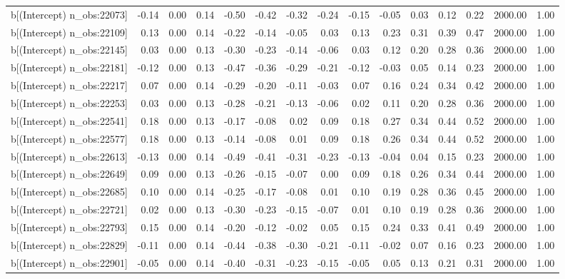 \begin{table}[ht]
\begin{tabular}{rrrrrrrrrrrrrrr}
  b[(Intercept) n\_obs:22073] & -0.14 & 0.00 & 0.14 & -0.50 & -0.42 & -0.32 & -0.24 & -0.15 & -0.05 & 0.03 & 0.12 & 0.22 & 2000.00 & 1.00 \\ 
  b[(Intercept) n\_obs:22109] & 0.13 & 0.00 & 0.14 & -0.22 & -0.14 & -0.05 & 0.03 & 0.13 & 0.23 & 0.31 & 0.39 & 0.47 & 2000.00 & 1.00 \\ 
  b[(Intercept) n\_obs:22145] & 0.03 & 0.00 & 0.13 & -0.30 & -0.23 & -0.14 & -0.06 & 0.03 & 0.12 & 0.20 & 0.28 & 0.36 & 2000.00 & 1.00 \\ 
  b[(Intercept) n\_obs:22181] & -0.12 & 0.00 & 0.13 & -0.47 & -0.36 & -0.29 & -0.21 & -0.12 & -0.03 & 0.05 & 0.14 & 0.23 & 2000.00 & 1.00 \\ 
  b[(Intercept) n\_obs:22217] & 0.07 & 0.00 & 0.14 & -0.29 & -0.20 & -0.11 & -0.03 & 0.07 & 0.16 & 0.24 & 0.34 & 0.42 & 2000.00 & 1.00 \\ 
  b[(Intercept) n\_obs:22253] & 0.03 & 0.00 & 0.13 & -0.28 & -0.21 & -0.13 & -0.06 & 0.02 & 0.11 & 0.20 & 0.28 & 0.36 & 2000.00 & 1.00 \\ 
  b[(Intercept) n\_obs:22541] & 0.18 & 0.00 & 0.13 & -0.17 & -0.08 & 0.02 & 0.09 & 0.18 & 0.27 & 0.34 & 0.44 & 0.52 & 2000.00 & 1.00 \\ 
  b[(Intercept) n\_obs:22577] & 0.18 & 0.00 & 0.13 & -0.14 & -0.08 & 0.01 & 0.09 & 0.18 & 0.26 & 0.34 & 0.44 & 0.52 & 2000.00 & 1.00 \\ 
  b[(Intercept) n\_obs:22613] & -0.13 & 0.00 & 0.14 & -0.49 & -0.41 & -0.31 & -0.23 & -0.13 & -0.04 & 0.04 & 0.15 & 0.23 & 2000.00 & 1.00 \\ 
  b[(Intercept) n\_obs:22649] & 0.09 & 0.00 & 0.13 & -0.26 & -0.15 & -0.07 & 0.00 & 0.09 & 0.18 & 0.26 & 0.34 & 0.44 & 2000.00 & 1.00 \\ 
  b[(Intercept) n\_obs:22685] & 0.10 & 0.00 & 0.14 & -0.25 & -0.17 & -0.08 & 0.01 & 0.10 & 0.19 & 0.28 & 0.36 & 0.45 & 2000.00 & 1.00 \\ 
  b[(Intercept) n\_obs:22721] & 0.02 & 0.00 & 0.13 & -0.30 & -0.23 & -0.15 & -0.07 & 0.01 & 0.10 & 0.19 & 0.28 & 0.36 & 2000.00 & 1.00 \\ 
  b[(Intercept) n\_obs:22793] & 0.15 & 0.00 & 0.14 & -0.20 & -0.12 & -0.02 & 0.05 & 0.15 & 0.24 & 0.33 & 0.41 & 0.49 & 2000.00 & 1.00 \\ 
  b[(Intercept) n\_obs:22829] & -0.11 & 0.00 & 0.14 & -0.44 & -0.38 & -0.30 & -0.21 & -0.11 & -0.02 & 0.07 & 0.16 & 0.23 & 2000.00 & 1.00 \\ 
  b[(Intercept) n\_obs:22901] & -0.05 & 0.00 & 0.14 & -0.40 & -0.31 & -0.23 & -0.15 & -0.05 & 0.05 & 0.13 & 0.21 & 0.31 & 2000.00 & 1.00 \\ 

\end{tabular}
\end{table}
